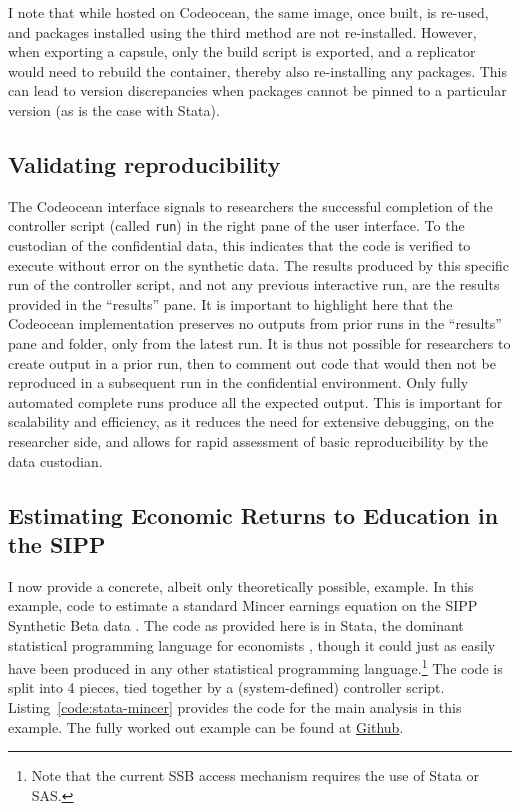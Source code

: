 \documentclass[inline]{hdsr}
\begin{document}
I note that while hosted on Codeocean, the same image, once built, is re-used, and packages installed using the third method are not re-installed. However, when exporting a capsule, only the build script is exported, and a replicator would need to rebuild the container, thereby also re-installing any packages. This can lead to version discrepancies when packages cannot be pinned to a particular version (as is the case with Stata). 

\subsection{Validating reproducibility}

The Codeocean interface signals to researchers the successful completion  of the controller script (called \texttt{run}) in the right pane of the user interface. To the custodian of the confidential data, this indicates that the code is verified to execute without error on the synthetic data. The results produced by this specific run of the controller script, and not any previous interactive run, are the results provided in the ``results'' pane.  It is important to highlight here that the Codeocean implementation preserves no outputs from prior runs in the ``results'' pane and folder, only from the latest run. It is thus not possible for researchers to create output in a prior run, then to comment out code that would then not be reproduced in a subsequent run in the confidential environment. Only fully automated complete runs produce all the expected output. This is important for scalability and efficiency, as it reduces the need for extensive debugging, on the researcher side, and allows for rapid assessment of basic reproducibility by the data custodian. 




\subsection{Estimating Economic Returns to Education in the SIPP}

I now provide a concrete, albeit only theoretically possible, example. In this example, code to estimate  a standard Mincer earnings equation \citep{mincer_schooling_1984,heckman_fifty_2003} on the SIPP Synthetic Beta data \citep{u.s.censusbureauSIPPSyntheticBeta2015b}. The code as provided here is in Stata, the dominant statistical programming language for economists \citep{10.1257/pandp.110.764}, though it could just as easily have been produced in any other statistical programming language.\footnote{Note that the current \ac{SSB} access mechanism \citep{u.s.censusbureauSIPPSyntheticBeta2015b} requires the use of Stata or SAS.} The code is split into 4 pieces, tied together by a (system-defined) controller script. Listing~\ref{code:stata-mincer} provides the code for the main analysis in this example. The fully worked out example can be found at \href{https://github.com/larsvilhuber/ssb-demo/releases/tag/v20250403}{Github}.
\end{document}
